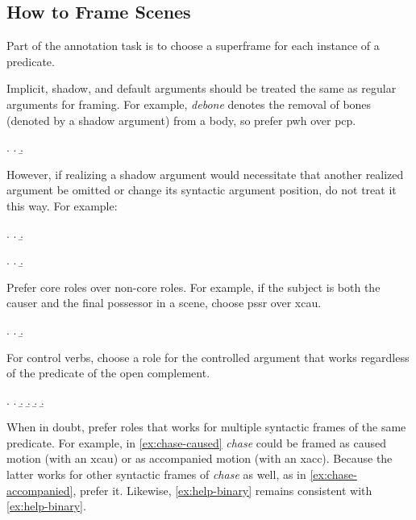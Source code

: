 \documentclass[a4paper]{article}
\begin{document}

\subsection{How to Frame Scenes}

Part of the annotation task is to choose a superframe for each instance of a predicate.

Implicit, shadow, and default arguments \citep{di-fabio-etal-2019-verbatlas} should
be treated the same as regular arguments for framing. For example,
\emph{debone} denotes the removal of bones (denoted by a shadow argument) from
a body, so prefer \textsf{pwh} over \textsf{pcp}.

\ex. \a. 
     \b. 

However, if realizing a shadow argument would necessitate that another realized
argument be omitted or change its syntactic argument position, do not treat it
this way. For example:

\ex. \a. 
     \b. 

\ex. \a. 
     \b. 

Prefer core roles over non-core roles. For example, if the subject is both the
causer and the final possessor in a scene, choose \textsf{pssr} over
\textsf{xcau}.

\ex. \a. 
     \b. 

For control verbs, choose a role for the controlled argument that works
regardless of the predicate of the open complement.

\ex.
\a. 
\b. 
\b. 
\b. 
\b. \label{ex:help-ternary} 

When in doubt, prefer roles that works for multiple syntactic frames of the
same predicate. For example, in \ref{ex:chase-caused} \emph{chase} could be
framed as caused motion (with an \textsf{xcau}) or as accompanied motion (with
an \textsf{xacc}). Because the latter works for other syntactic frames of
\emph{chase} as well, as in \ref{ex:chase-accompanied}, prefer it. Likewise,
\ref{ex:help-binary} remains consistent with \ref{ex:help-binary}.
\end{document}
